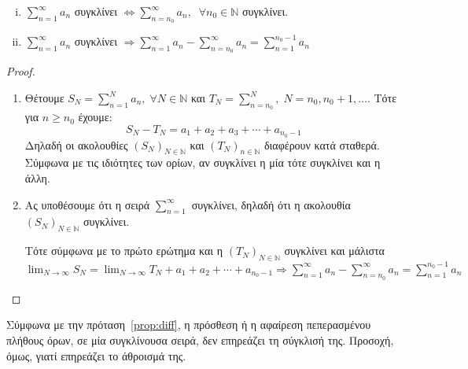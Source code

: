 \documentclass[a4paper,table]{report}
\begin{document}
\begin{mybox3}
\begin{prop}
  \begin{enumerate}[i)]
    \mbox{}
    \item $ \sum_{n=1}^{\infty} a_{n}  $ συγκλίνει 
      $ \Leftrightarrow \sum_{n= n_{0}}^{\infty} a_{n}, \; \; \forall n_{0} 
      \in \mathbb{N}  $ συγκλίνει.
    \item\label{prop:diff2} $ \sum_{n=1}^{\infty} a_{n}  $ συγκλίνει 
      $ \Rightarrow \sum_{n=1}^{\infty} a_{n} - \sum_{n= n_{0}}^{\infty} a_{n}  
      = \sum_{n=1}^{n_{0}-1} a_{n} $
  \end{enumerate}
  \label{prop:diff}
\end{prop}
\end{mybox3}
\begin{proof}
\item {}
    \begin{enumerate}
        \item Θέτουμε $ S_{N} = \sum_{n=1}^{N} a_{n}, \; 
            \forall N \in \mathbb{N} $ και $ T_{N} = \sum_{n= n_{0}}^{N}, \; N= n_{0}, 
            n_{0}+1, \ldots $. Τότε για $ n \geq n_{0} $ έχουμε:
            \[
                S_{N}-T_{N} = a_{1}+ a_{2}+ a_{3}+ \cdots + a_{n_0-1} 
            \] 
            Δηλαδή οι ακολουθίες $ (S_{N})_{N \in \mathbb{N}} $ και 
            $ (T_{N})_{n \in \mathbb{N}} $ διαφέρουν κατά σταθερά. Σύμφωνα 
            με τις ιδιότητες των ορίων, αν συγκλίνει η μία τότε συγκλίνει και η άλλη.

        \item Ας υποθέσουμε ότι η σειρά $ \sum_{n=1}^{\infty} $ συγκλίνει, 
            δηλαδή ότι η ακολουθία $ (S_{N})_{N \in \mathbb{N}} $ συγκλίνει. 

            Τότε σύμφωνα με το πρώτο ερώτημα και η $ (T_{N})_{N \in \mathbb{N}} $
            συγκλίνει και μάλιστα $ \lim_{N \to \infty} S_{N} = \lim_{N \to \infty} 
            T_{N} + a_{1}+ a_{2} + \cdots + a_{n_{0}-1} 
            \Rightarrow \sum_{n=1}^{\infty} a_{n}- \sum_{n= n_{0}}^{\infty} a_{n} = 
            \sum_{n=1}^{n_{0}-1} a_{n}    $
    \end{enumerate}
\end{proof}

\begin{rem}
  Σύμφωνα με την  πρόταση~\ref{prop:diff}, η πρόσθεση ή η αφαίρεση πεπερασμένου 
  πλήθους όρων, σε μία συγκλίνουσα σειρά, δεν επηρεάζει τη σύγκλισή της. Προσοχή, όμως,
  γιατί επηρεάζει το άθροισμά της.
\end{rem}
\end{document}
